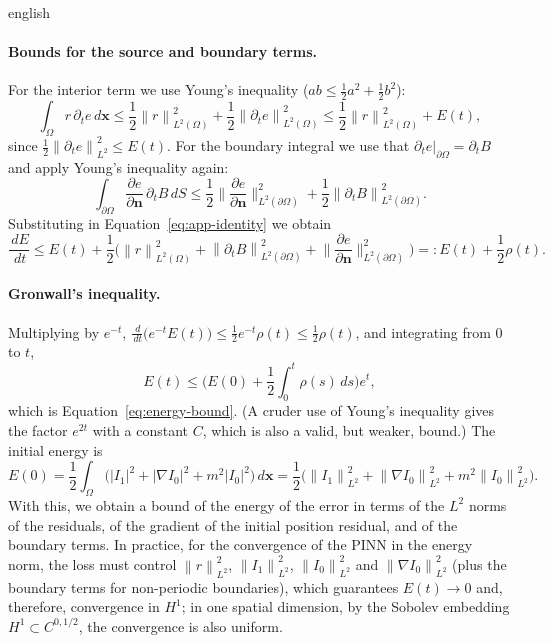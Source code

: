\documentclass[12pt,letterpaper,twoside]{book}
\newcommand{\norm}[1]{\left\lVert #1 \right\rVert}
\newcommand{\abs}[1]{\left\lvert #1 \right\rvert}
\begin{document}
\begin{hyphenrules}{english}
\paragraph{Bounds for the source and boundary terms.}
For the interior term we use Young's inequality ($ab\le\frac12a^2+\frac12b^2$):
\[
  \int_\Omega r\,\partial_te\,d\mathbf{x}\le\frac12\norm{r}^2_{L^2(\Omega)}+\frac12\norm{\partial_te}^2_{L^2(\Omega)}
  \le\frac12\norm{r}^2_{L^2(\Omega)}+E(t),
\]
since $\frac12\norm{\partial_te}^2_{L^2}\le E(t)$. For the boundary integral we use that
$\partial_te|_{\partial\Omega}=\partial_tB$ and apply Young's inequality again:
\[
  \int_{\partial\Omega}\frac{\partial e}{\partial\mathbf{n}}\,\partial_tB\,d S
  \le\frac12\Big\|\frac{\partial e}{\partial\mathbf{n}}\Big\|^2_{L^2(\partial\Omega)}+\frac12\norm{\partial_tB}^2_{L^2(\partial\Omega)}.
\]
Substituting in Equation~\eqref{eq:app-identity} we obtain
\begin{equation}
  \frac{\,d E}{\,d t}\le E(t)+\frac12\Big(\norm{r}^2_{L^2(\Omega)}+\norm{\partial_tB}^2_{L^2(\partial\Omega)}
  +\Big\|\frac{\partial e}{\partial\mathbf{n}}\Big\|^2_{L^2(\partial\Omega)}\Big)=:E(t)+\frac12\rho(t).
  \label{eq:app-differential}
\end{equation}

\paragraph{Gronwall's inequality.}
Multiplying by $e^{-t}$, $\frac{\,d}{\,d t}\big(e^{-t}E(t)\big)\le\frac12e^{-t}\rho(t)\le\frac12\rho(t)$, and
integrating from $0$ to $t$,
\[
  E(t)\le\Big(E(0)+\frac12\int_0^t\rho(s)\,d s\Big)e^{t},
\]
which is Equation~\eqref{eq:energy-bound}. (A cruder use of Young's inequality gives the factor $e^{2t}$ with a constant $C$, which is also
a valid, but weaker, bound.) The initial energy is
\[
  E(0)=\frac12\int_\Omega\Big(\abs{I_1}^2+\abs{\nabla I_0}^2+m^2\abs{I_0}^2\Big)\,d\mathbf{x}
  =\frac12\Big(\norm{I_1}^2_{L^2}+\norm{\nabla I_0}^2_{L^2}+m^2\norm{I_0}^2_{L^2}\Big).
\]
With this, we obtain a bound of the energy of the error in terms of the $L^2$ norms of the residuals, of the
gradient of the initial position residual, and of the boundary terms. In practice, for the convergence of
the PINN in the energy norm, the loss must control $\norm{r}^2_{L^2}$, $\norm{I_1}^2_{L^2}$,
$\norm{I_0}^2_{L^2}$ and $\norm{\nabla I_0}^2_{L^2}$ (plus the boundary terms for non-periodic boundaries),
which guarantees $E(t)\to0$ and, therefore, convergence in $H^1$; in one spatial dimension, by the Sobolev
embedding $H^1\subset C^{0,1/2}$, the convergence is also uniform.


\end{hyphenrules}
\end{document}
